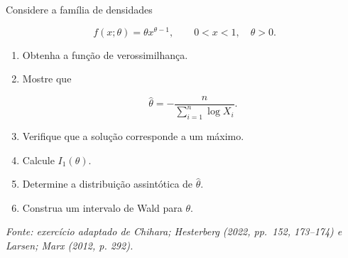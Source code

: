 \documentclass[
  letterpaper,
  DIV=11,
  numbers=noendperiod]{scrreprt}
\begin{document}
\begin{tcolorbox}[enhanced jigsaw, colback=white, leftrule=.75mm, colbacktitle=quarto-callout-tip-color!10!white, breakable, titlerule=0mm, bottomtitle=1mm, title=\textcolor{quarto-callout-tip-color}{\faLightbulb}\hspace{0.5em}{Exercício 4 --- Família de potências}, colframe=quarto-callout-tip-color-frame, toprule=.15mm, opacityback=0, bottomrule=.15mm, opacitybacktitle=0.6, arc=.35mm, toptitle=1mm, rightrule=.15mm, coltitle=black, left=2mm]

Considere a família de densidades

\[f(x;\theta)
=
\theta x^{\theta-1},
\qquad
0<x<1,\quad\theta>0.\]

\begin{enumerate}
\def\labelenumi{\arabic{enumi}.}
\item
  Obtenha a função de verossimilhança.
\item
  Mostre que

  \[\widehat\theta
  =
  -\frac{n}{
  \sum_{i=1}^n\log X_i
  }.\]
\item
  Verifique que a solução corresponde a um máximo.
\item
  Calcule \(I_1(\theta)\).
\item
  Determine a distribuição assintótica de \(\widehat\theta\).
\item
  Construa um intervalo de Wald para \(\theta\).
\end{enumerate}

\emph{Fonte: exercício adaptado de Chihara; Hesterberg (2022, pp.~152,
173--174) e Larsen; Marx (2012, p. 292).}

\end{tcolorbox}
\end{document}
